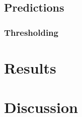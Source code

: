 \documentclass[USenglish]{ifimaster}  %
\begin{document}
\section{Predictions}
\subsection{Thresholding}


\chapter{Results}                     

\chapter{Discussion}



\backmatter{}
\printbibliography
\end{document}
